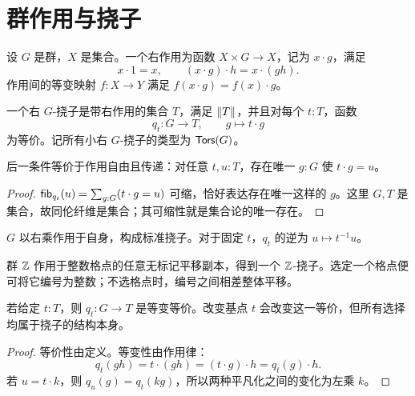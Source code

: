 \section{群作用与挠子}
\begin{definition}[右群作用]
设 $G$ 是群，$X$ 是集合。一个右作用为函数 $X\times G\to X$，记为 $x\cdot g$，满足
\[
x\cdot1=x,
\qquad
(x\cdot g)\cdot h=x\cdot(gh).
\]
作用间的等变映射 $f:X\to Y$ 满足 $f(x\cdot g)=f(x)\cdot g$。
\end{definition}
\begin{definition}[$G$-挠子]
一个右 $G$-挠子是带右作用的集合 $T$，满足 $\left\|T\right\|$，并且对每个 $t:T$，函数
\[
q_t:G\to T,\qquad g\longmapsto t\cdot g
\]
为等价。记所有小右 $G$-挠子的类型为 $\mathsf{Tors}(G)$。
\end{definition}
\begin{lemma}
后一条件等价于作用自由且传递：对任意 $t,u:T$，存在唯一 $g:G$ 使 $t\cdot g=u$。
\end{lemma}
\begin{proof}
$\mathsf{fib}_{q_t}(u)=\sum_{g:G}(t\cdot g=u)$ 可缩，恰好表达存在唯一这样的 $g$。这里 $G,T$ 是集合，故同伦纤维是集合；其可缩性就是集合论的唯一存在。
\end{proof}
\begin{example}
$G$ 以右乘作用于自身，构成标准挠子。对于固定 $t$，$q_t$ 的逆为 $u\mapsto t^{-1}u$。

群 $\mathbb Z$ 作用于整数格点的任意无标记平移副本，得到一个 $\mathbb Z$-挠子。选定一个格点便可将它编号为整数；不选格点时，编号之间相差整体平移。
\end{example}
\begin{proposition}[挠子的局部平凡化]
若给定 $t:T$，则 $q_t:G\to T$ 是等变等价。改变基点 $t$ 会改变这一等价，但所有选择均属于挠子的结构本身。
\end{proposition}
\begin{proof}
等价性由定义。等变性由作用律：
\[
q_t(gh)=t\cdot(gh)=(t\cdot g)\cdot h=q_t(g)\cdot h.
\]
若 $u=t\cdot k$，则 $q_u(g)=q_t(kg)$，所以两种平凡化之间的变化为左乘 $k$。
\end{proof}

